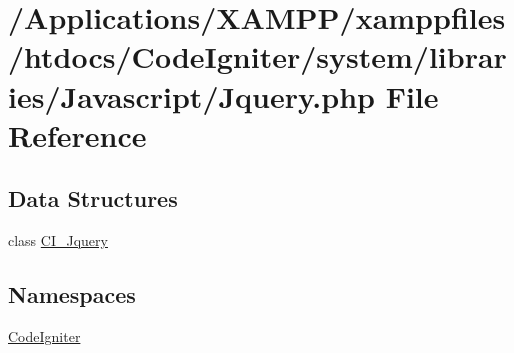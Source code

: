 \hypertarget{_jquery_8php}{}\section{/\+Applications/\+X\+A\+M\+P\+P/xamppfiles/htdocs/\+Code\+Igniter/system/libraries/\+Javascript/\+Jquery.php File Reference}
\label{_jquery_8php}
\subsection*{Data Structures}
\begin{DoxyCompactItemize}
\item 
class \mbox{\hyperlink{class_c_i___jquery}{C\+I\+\_\+\+Jquery}}
\end{DoxyCompactItemize}
\subsection*{Namespaces}
\begin{DoxyCompactItemize}
\item 
 \mbox{\hyperlink{namespace_code_igniter}{Code\+Igniter}}
\end{DoxyCompactItemize}
